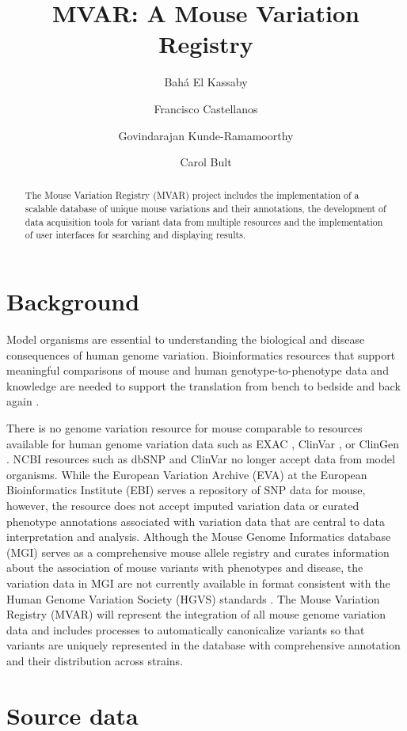 \documentclass{article}
\title{MVAR: A Mouse Variation Registry}
\author[1]{Bah\'{a} El Kassaby}
\author[1]{Francisco Castellanos}
\author[1]{Govindarajan Kunde-Ramamoorthy}
\author[1]{Carol Bult}
\affil[1]{The Jackson Laboratory, Bar Harbor, Maine, USA}
\begin{document}
\maketitle

\begin{abstract}
The Mouse Variation Registry (MVAR) project includes the implementation of a scalable database of unique mouse variations and their annotations, the development of data acquisition tools for variant data from multiple resources and the implementation of user interfaces for searching and displaying results.
\end{abstract}

\section{Background}

Model organisms are essential to understanding the biological and disease consequences of human genome variation. Bioinformatics resources that support meaningful comparisons of mouse and human genotype-to-phenotype data and knowledge are needed to support the translation from bench to bedside and back again \cite{manolio17}.

There is no genome variation resource for mouse comparable to resources available for human genome variation data such as EXAC \cite{karczewski17}, ClinVar \cite{landrum14}, or ClinGen \cite{rehm15}. NCBI resources such as dbSNP and ClinVar no longer accept data from model organisms. While the European Variation Archive (EVA) at the European Bioinformatics Institute (EBI) serves a repository of SNP data for mouse, however, the resource does not accept imputed variation data or curated phenotype annotations associated with variation data that are central to data interpretation and analysis. Although the Mouse Genome Informatics database (MGI) \cite{bult18} serves as a comprehensive mouse allele registry and curates information about the association of mouse variants with phenotypes and disease, the variation data in MGI are not currently available in format consistent with the Human Genome Variation Society (HGVS) standards \cite{hgvs}. The Mouse Variation Registry (MVAR) will represent the integration of all mouse genome variation data and includes processes to automatically canonicalize variants so that variants are uniquely represented in the database with comprehensive annotation and their distribution across strains.

\section{Source data}
\end{document}
